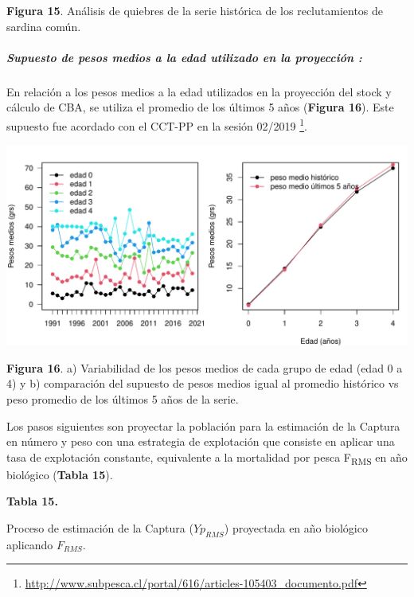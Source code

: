 \documentclass[
  spanish,
]{article}
\begin{document}
\small

\textbf{Figura 15}. Análisis de quiebres de la serie histórica de los
reclutamientos de sardina común. \vspace{0.5cm} \normalsize

\hypertarget{supuesto-de-pesos-medios-a-la-edad-utilizado-en-la-proyecciuxf3n}{%
\subparagraph{Supuesto de pesos medios a la edad utilizado en la
proyección
:}\label{supuesto-de-pesos-medios-a-la-edad-utilizado-en-la-proyecciuxf3n}}

En relación a los pesos medios a la edad utilizados en la proyección del
stock y cálculo de CBA, se utiliza el promedio de los últimos 5 años
(\textbf{Figura 16}). Este supuesto fue acordado con el CCT-PP en la
sesión 02/2019 \footnote{\url{http://www.subpesca.cl/portal/616/articles-105403_documento.pdf}}.

\begin{center}\includegraphics{FigurasInforme_Marzo/metod_datos_pesosmedios-1} \end{center}

\small

\textbf{Figura 16}. a) Variabilidad de los pesos medios de cada grupo de
edad (edad 0 a 4) y b) comparación del supuesto de pesos medios igual al
promedio histórico vs peso promedio de los últimos 5 años de la serie.
\vspace{0.5cm} \normalsize

\pagebreak

Los pasos siguientes son proyectar la población para la estimación de la
Captura en número y peso con una estrategia de explotación que consiste
en aplicar una tasa de explotación constante, equivalente a la
mortalidad por pesca F\textsubscript{RMS} en año biológico
(\textbf{Tabla 15}). \vspace{0.5cm}

\small
\begin{center} 
\textbf{Tabla 15.}
\end{center}
\begin{center} 
\vspace{-0.2cm} Proceso de estimación de la Captura ($Yp_{RMS}$) proyectada en año biológico aplicando $F_{RMS}$.
\end{center}
\vspace{-0.2cm}
\end{document}
